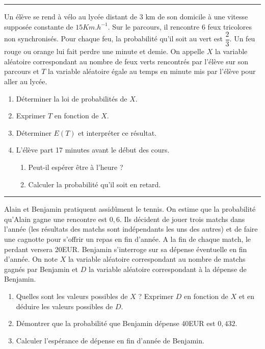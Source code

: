 \documentclass[../PolyS4.tex]{subfiles}
\begin{document}
\hfill\break
\hrule
\hfill\break



Un élève se rend à vélo au lycée distant de $3$ km de son domicile à une vitesse supposée constante de $15Km.h^{-1}$.
Sur le parcours, il rencontre $6$ feux tricolores non synchronisés. Pour chaque feu, la probabilité qu'il soit au vert est $\dfrac{2}{3}$.
Un feu rouge ou orange lui fait perdre une minute et demie. On appelle $X$ la variable aléatoire correspondant au
nombre de feux verts rencontrés par l'élève sur son parcours et $T$ la variable aléatoire égale au temps en minute mis par l'élève pour aller au lycée.
\begin{enumerate}
\item Déterminer la loi de probabilités de $X$.
\item Exprimer $T$ en fonction de $X$.
\item Déterminer $E(T)$ et interpréter ce résultat.
\item L'élève part 17 minutes avant le début des cours.\begin{enumerate}
\item Peut-il espérer être à l'heure ?
\item Calculer la probabilité qu'il soit en retard.\\
\end{enumerate}
\end{enumerate}

\hfill\break
\hrule
\hfill\break


Alain et Benjamin pratiquent assidûment le tennis. On estime que la probabilité qu'Alain gagne une rencontre est $0,6$. Ils décident de jouer trois matchs dans l'année (les résultats des matchs sont indépendants les uns des autres) et de faire une cagnotte pour s'offrir un repas en fin d'année. A la fin de chaque match, le perdant versera 20EUR.
Benjamin s'interroge sur sa dépense éventuelle en fin d'année.
On note $X$ la variable aléatoire correspondant au nombre de matchs gagnés par Benjamin et $D$ la variable aléatoire correspondant à la dépense de Benjamin.
\begin{enumerate}
\item Quelles sont les valeurs possibles de $X$ ? Exprimer $D$ en fonction de $X$ et en déduire les valeurs possibles de $D$.
\item Démontrer que la probabilité que Benjamin dépense 40EUR est $0,432$.
\item Calculer l'espérance de dépense en fin d'année de Benjamin.\\
\end{enumerate}
\end{document}
